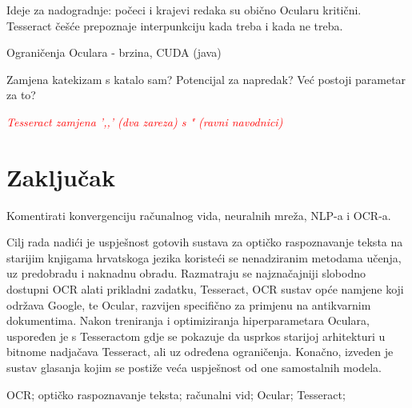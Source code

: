 \documentclass[zavrsnirad]{fer}
\begin{document}
Ideje za nadogradnje: počeci i krajevi redaka su obično Ocularu kritični. Tesseract češće prepoznaje interpunkciju kada treba i kada ne treba.

Ograničenja Oculara - brzina, CUDA (java)

Zamjena katekizam s katalo sam? Potencijal za napredak? Već postoji parametar za to?

\textcolor{red}{\textit{Tesseract zamjena ',,' (dva zareza) s " (ravni navodnici)}}


\chapter{Zaključak}
\label{pog:zakljucak}

Komentirati konvergenciju računalnog vida, neuralnih mreža, NLP-a i OCR-a.








\begin{sazetak}
  Cilj rada nadići je uspješnost gotovih sustava za optičko raspoznavanje teksta na starijim knjigama hrvatskoga jezika koristeći se nenadziranim metodama učenja, uz predobradu i naknadnu obradu. Razmatraju se najznačajniji slobodno dostupni OCR alati prikladni zadatku, Tesseract, OCR sustav opće namjene koji održava Google, te Ocular, razvijen specifično za primjenu na antikvarnim dokumentima. Nakon treniranja i optimiziranja hiperparametara Oculara, uspoređen je s Tesseractom gdje se pokazuje da usprkos starijoj arhitekturi u bitnome nadjačava Tesseract, ali uz određena ograničenja. Konačno, izveden je sustav glasanja kojim se postiže veća uspješnost od one samostalnih modela.
\end{sazetak}

\begin{kljucnerijeci}
  OCR; optičko raspoznavanje teksta; računalni vid; Ocular; Tesseract;
\end{kljucnerijeci}
\end{document}
